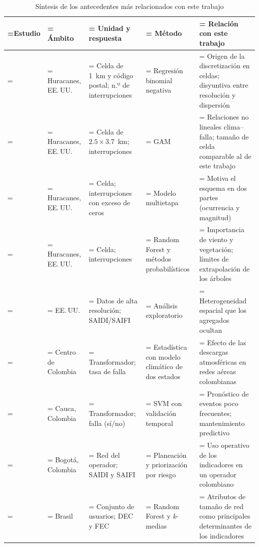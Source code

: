 \begin{table}[!htbp]
\centering
\footnotesize
\setlength{\tabcolsep}{3pt}
\caption{Síntesis de los antecedentes más relacionados con este trabajo}
\label{tab:antecedentes}
\begin{tabularx}{\linewidth}{@{} >{\raggedright\arraybackslash\hsize=0.845\hsize\linewidth=\hsize}X >{\raggedright\arraybackslash\hsize=0.704\hsize\linewidth=\hsize}X >{\raggedright\arraybackslash\hsize=1.056\hsize\linewidth=\hsize}X >{\raggedright\arraybackslash\hsize=0.845\hsize\linewidth=\hsize}X >{\raggedright\arraybackslash\hsize=1.549\hsize\linewidth=\hsize}X @{}}
\toprule
\textbf{Estudio} & \textbf{Ámbito} & \textbf{Unidad y respuesta} & \textbf{Método} & \textbf{Relación con este trabajo} \\
\midrule
\textcite{ref68liu} & Huracanes, EE.\,UU. & Celda de 1~km y código postal; n.º de interrupciones & Regresión binomial negativa & Origen de la discretización en celdas; disyuntiva entre resolución y dispersión \\
\textcite{ref41} & Huracanes, EE.\,UU. & Celda de $2{.}5\times3{.}7$~km; interrupciones & GAM & Relaciones no lineales clima--falla; tamaño de celda comparable al de este trabajo \\
\textcite{ref42} & Huracanes, EE.\,UU. & Celda; interrupciones con exceso de ceros & Modelo multietapa & Motiva el esquema en dos partes (ocurrencia y magnitud) \\
\textcite{ref43} & Huracanes, EE.\,UU. & Celda; interrupciones & Random Forest y métodos probabilísticos & Importancia de viento y vegetación; límites de extrapolación de los árboles \\
\textcite{ref8} & EE.\,UU. & Datos de alta resolución; SAIDI/SAIFI & Análisis exploratorio & Heterogeneidad espacial que los agregados ocultan \\
\textcite{aranguren2015} & Centro de Colombia & Transformador; tasa de falla & Estadística con modelo climático de dos estados & Efecto de las descargas atmosféricas en redes aéreas colombianas \\
\textcite{alvarez2022} & Cauca, Colombia & Transformador; falla (sí/no) & SVM con validación temporal & Pronóstico de eventos poco frecuentes; mantenimiento predictivo \\
\textcite{gomez2017} & Bogotá, Colombia & Red del operador; SAIDI y SAIFI & Planeación y priorización por riesgo & Uso operativo de los indicadores en un operador colombiano \\
\textcite{dacosta2023} & Brasil & Conjunto de usuarios; DEC y FEC & Random Forest y \emph{k}-medias & Atributos de tamaño de red como principales determinantes de los indicadores \\

\end{tabularx}
\end{table}
